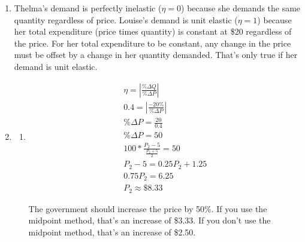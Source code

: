 \documentclass{article}
\begin{document}
\begin{enumerate}
\begin{enumerate}
	\item Based on my estimate, demand for subway rides is inelastic. Therefore, when the Transit Authority raises fares, we should expect revenue to increase. That's because quantity demanded will decrease proportionately less than fares will increase. 
	
	\item The estimate is unreliable because there could be other reasons for the decrease in ridership. For example, it's possible that gas was cheaper and the weather was worse in December 1995. If that were the case, people would be more inclined to drive or stay home than they would be to take the subway. (This question doesn't test anything we've learned. It's just a common sense question that hints at econometrics, a statistics course you'll take in college if you choose to pursue economics.) 
	
	\end{enumerate} 
	
\item Thelma's demand is perfectly inelastic ($\eta = 0$) because she demands the same quantity regardless of price. Louise's demand is unit elastic ($\eta = 1$) because her total expenditure (price times quantity) is constant at \$20 regardless of the price. For her total expenditure to be constant, any change in the price must be offset by a change in her quantity demanded. That's only true if her demand is unit elastic.

\item

	\begin{enumerate}
	
	\item 
	
		\begin{gather*}
		\eta = \left| \frac{\% \Delta Q}{\% \Delta P} \right| \\
		0.4 = \left| \frac{-20 \%}{\% \Delta P} \right| \\
		\% \Delta P = \frac{20}{0.4} \\
		\% \Delta P = 50 \\
		100 * \frac{P_2 - 5}{\frac{P_2 + 5}{2}} = 50 \\
		P_2 - 5 = 0.25P_2 + 1.25 \\
		0.75P_2 = 6.25 \\
		P_2 \approx \$8.33
		\end{gather*}
		
		The government should increase the price by 50\%. If you use the midpoint method, that's an increase of \$3.33. If you don't use the midpoint method, that's an increase of \$2.50.
		

\end{enumerate}
\end{enumerate}
\end{document}
